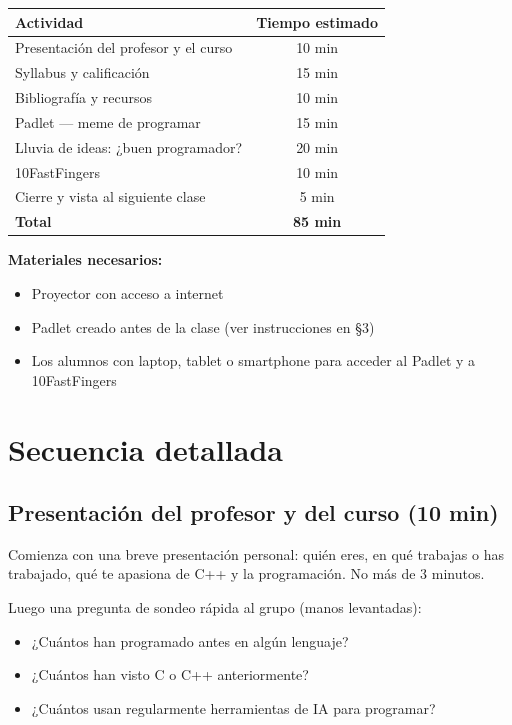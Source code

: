 \documentclass[12pt, oneside]{article}
\begin{document}
\begin{center}
\begin{tabular}{lc}
  \toprule
  \textbf{Actividad} & \textbf{Tiempo estimado} \\
  \midrule
  Presentación del profesor y el curso & 10 min \\
  Syllabus y calificación              & 15 min \\
  Bibliografía y recursos              & 10 min \\
  Padlet — meme de programar           & 15 min \\
  Lluvia de ideas: ¿buen programador?  & 20 min \\
  10FastFingers                        & 10 min \\
  Cierre y vista al siguiente clase    &  5 min \\
  \midrule
  \textbf{Total}                       & \textbf{85 min} \\
  \bottomrule
\end{tabular}
\end{center}

\noindent\textbf{Materiales necesarios:}
\begin{itemize}
  \item Proyector con acceso a internet
  \item Padlet creado antes de la clase (ver instrucciones en \S3)
  \item Los alumnos con laptop, tablet o smartphone para acceder al Padlet
        y a 10FastFingers
\end{itemize}

\section{Secuencia detallada}

\subsection{Presentación del profesor y del curso (10 min)}

Comienza con una breve presentación personal: quién eres, en qué trabajas o
has trabajado, qué te apasiona de C++ y la programación. No más de 3 minutos.

Luego una pregunta de sondeo rápida al grupo (manos levantadas):
\begin{itemize}
  \item ¿Cuántos han programado antes en algún lenguaje?
  \item ¿Cuántos han visto C o C++ anteriormente?
  \item ¿Cuántos usan regularmente herramientas de IA para programar?
\end{itemize}
\end{document}
